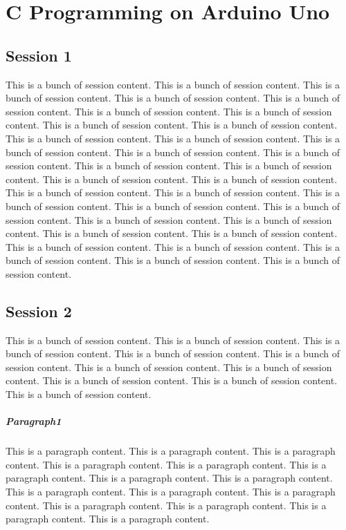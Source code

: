 \chapter{C Programming on Arduino Uno}

\section{Session 1}
This is a bunch of session content. This is a bunch of session content. This is a bunch of session content. This is a bunch of session content. This is a bunch of session content. This is a bunch of session content. This is a bunch of session content. This is a bunch of session content. This is a bunch of session content. This is a bunch of session content. This is a bunch of session content. This is a bunch of session content. This is a bunch of session content. This is a bunch of session content. This is a bunch of session content. This is a bunch of session content. This is a bunch of session content. This is a bunch of session content. This is a bunch of session content. This is a bunch of session content. This is a bunch of session content. This is a bunch of session content. This is a bunch of session content. This is a bunch of session content. This is a bunch of session content. This is a bunch of session content. This is a bunch of session content. This is a bunch of session content. This is a bunch of session content. This is a bunch of session content. This is a bunch of session content. This is a bunch of session content.

\section{Session 2}
This is a bunch of session content. This is a bunch of session content. This is a bunch of session content. This is a bunch of session content. This is a bunch of session content. This is a bunch of session content. This is a bunch of session content. This is a bunch of session content. This is a bunch of session content. This is a bunch of session content.
\paragraph{Paragraph1}
This is a paragraph content. This is a paragraph content. This is a paragraph content. This is a paragraph content. This is a paragraph content. This is a paragraph content. This is a paragraph content. This is a paragraph content. This is a paragraph content. This is a paragraph content. This is a paragraph content. This is a paragraph content. This is a paragraph content. This is a paragraph content. This is a paragraph content.
